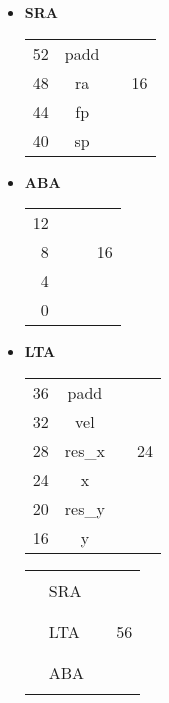 \documentclass[a4paper,10pt]{article}
\begin{document}
\begin{itemize}
\item \textbf{SRA}
\begin{center}
\begin{tabular}{ r | c | c | l }
  \cline{2-2}                       
  52 & padd& & \\ \cline{2-2}
  48 & ra & &  16 \\ \cline{2-2}
  44 & fp& & \\ \cline{2-2}
  40 & sp & &\\
  \cline{2-2}
\end{tabular}
\end{center}

\item \textbf{ABA}
\begin{center}
\begin{tabular}{ r | p{1cm} | c | l }
  \cline{2-2}                       
  12 &  & & \\ \cline{2-2}
  8 &   & &  16 \\ \cline{2-2}
  4 &  & & \\ \cline{2-2}
  0 &   & &\\
  \cline{2-2}
\end{tabular}
\end{center}

\item \textbf{LTA}
\begin{center}
\begin{tabular}{ r | c | c | l }
  \cline{2-2}                       
  36 & padd& & \\ \cline{2-2}
  32 & vel & &   \\ \cline{2-2}
  28 & res\_x & & 24 \\ \cline{2-2}
  24 & x & &\\ \cline{2-2}
  20 & res\_y & & \\ \cline{2-2}
  16 & y & &\\
  \cline{2-2}
\end{tabular}
\end{center}

\begin{center}
\begin{tabular}{ r | p{1cm} | c | l }
  \cline{2-2}              
   & & & \\        
   & SRA & & \\ 
   & & & \\ \cline{2-2}
   & & & \\ 
   & LTA & &  56 \\ 
   & & & \\ \cline{2-2}
   & & & \\ 
   & ABA & &\\
   & & & \\ 
  \cline{2-2}
\end{tabular}
\end{center}

\end{itemize}
\end{document}
